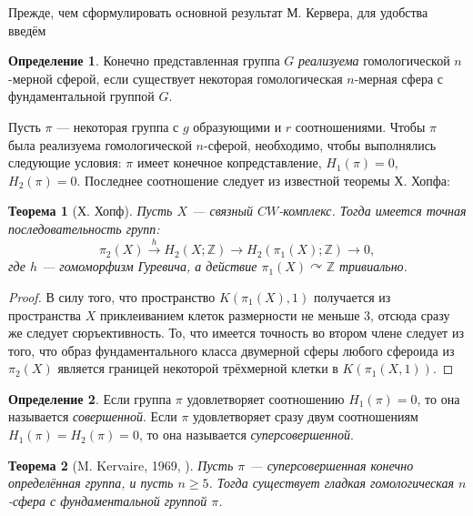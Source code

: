 \documentclass[14pt, dvipsnames, twoside]{extarticle}
\newtheorem{theorem}{Теорема}
\theoremstyle{definition}
\newtheorem{defi}{Определение}
\theoremstyle{remark}
\begin{document}
Прежде, чем сформулировать основной результат М. Кервера, для удобства введём 

\begin{defi}
Конечно представленная группа $G$ {\it реализуема} гомологической $n$-мерной сферой, если существует некоторая гомологическая $n$-мерная сфера с фундаментальной группой $G$.  
\end{defi}

Пусть $\pi$ --- некоторая группа с $g$ образующими и $r$ соотношениями. Чтобы $\pi$ была реализуема гомологической $n$-сферой, необходимо, чтобы выполнялись следующие условия: $\pi$ имеет конечное копредставление, $H_1(\pi)=0$, $H_2(\pi)=0$. Последнее соотношение следует из известной теоремы Х. Хопфа:

\begin{theorem}[Х. Хопф]
Пусть $X$ --- связный $CW$-комплекс. Тогда имеется точная последовательность групп: $$\pi_2(X)\overset{h}{\to} H_2(X; \mathbb{Z})\to H_2(\pi_1(X); \mathbb{Z})\to 0,$$ где $h$ --- гомоморфизм Гуревича, а действие $\pi_1(X)\curvearrowright\mathbb{Z}$ тривиально.
\end{theorem}   

\begin{proof}
В силу того, что пространство $K(\pi_1(X), 1)$ получается из пространства $X$ приклеиванием клеток размерности не меньше 3, отсюда сразу же следует сюръективность. То, что имеется точность во втором члене следует из того, что образ фундаментального класса двумерной сферы любого сфероида из $\pi_2(X)$ является границей некоторой трёхмерной клетки в $K(\pi_1(X, 1)).$    
\end{proof}



\begin{defi}
Если группа $\pi$ удовлетворяет соотношению $H_1(\pi)=0$, то она называется {\it совершенной}. Если $\pi$ удовлетворяет сразу двум соотношениям $H_1(\pi)=H_2(\pi)=0$, то она называется {\it суперсовершенной}.
\end{defi}

\begin{theorem}[M. Kervaire, 1969, \cite{Kervaire}]\label{high_dim}
Пусть $\pi$ --- суперсовершенная конечно определённая группа, и пусть $n\geqslant 5$. Тогда существует гладкая гомологическая $n$-сфера с фундаментальной группой $\pi$.
\end{theorem}
\end{document}
